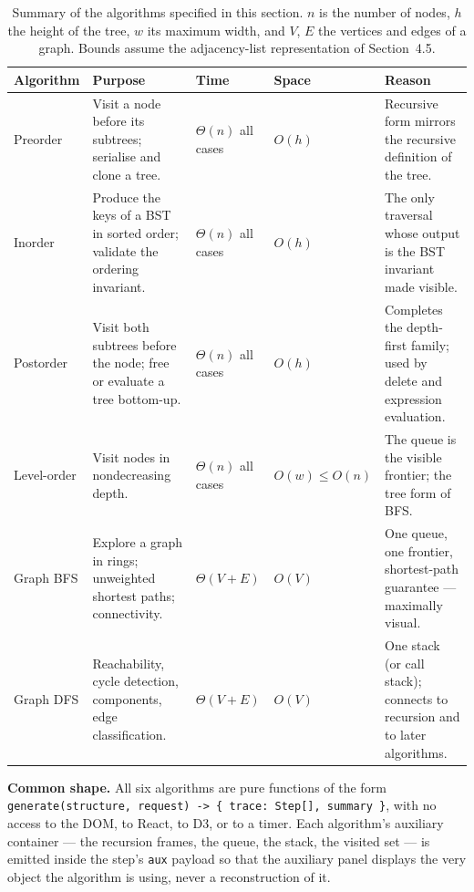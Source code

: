 \documentclass[11pt,a4paper]{article}
\newcommand{\ct}[1]{\texttt{#1}}
\begin{document}
\begin{table}[H]
\centering
\small
\setlength{\tabcolsep}{4pt}
\begin{tabular}{@{}L{3.1cm}L{4.6cm}L{2.4cm}L{1.9cm}L{3.1cm}@{}}
\toprule
\textbf{Algorithm} & \textbf{Purpose} & \textbf{Time} & \textbf{Space} & \textbf{Reason} \\
\midrule
Preorder & Visit a node before its subtrees; serialise and clone a tree. &
$\Theta(n)$ all cases & $O(h)$ &
Recursive form mirrors the recursive definition of the tree. \\
Inorder & Produce the keys of a BST in sorted order; validate the ordering invariant. &
$\Theta(n)$ all cases & $O(h)$ &
The only traversal whose output is the BST invariant made visible. \\
Postorder & Visit both subtrees before the node; free or evaluate a tree bottom-up. &
$\Theta(n)$ all cases & $O(h)$ &
Completes the depth-first family; used by delete and expression evaluation. \\
Level-order & Visit nodes in nondecreasing depth. &
$\Theta(n)$ all cases & $O(w)\le O(n)$ &
The queue is the visible frontier; the tree form of BFS. \\
Graph BFS & Explore a graph in rings; unweighted shortest paths; connectivity. &
$\Theta(V+E)$ & $O(V)$ &
One queue, one frontier, shortest-path guarantee --- maximally visual. \\
Graph DFS & Reachability, cycle detection, components, edge classification. &
$\Theta(V+E)$ & $O(V)$ &
One stack (or call stack); connects to recursion and to later algorithms. \\
\bottomrule
\end{tabular}
\caption{Summary of the algorithms specified in this section. $n$ is the number of nodes, $h$
the height of the tree, $w$ its maximum width, and $V$, $E$ the vertices and edges of a
graph. Bounds assume the adjacency-list representation of Section~4.5.}
\end{table}

\medskip
\noindent\textbf{Common shape.} All six algorithms are pure functions of the form
\ct{generate(structure, request) -> \{ trace: Step[], summary \}}, with no access to the DOM, to
React, to D3, or to a timer. Each algorithm's auxiliary container --- the recursion frames, the
queue, the stack, the visited set --- is emitted inside the step's \ct{aux} payload so that the
auxiliary panel displays the very object the algorithm is using, never a reconstruction of it.
\end{document}
